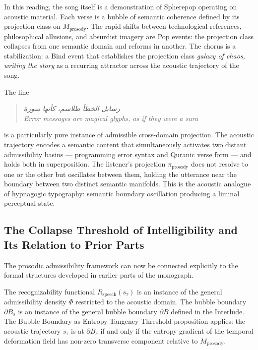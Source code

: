 \documentclass[12pt, a4paper]{article}
\theoremstyle{essaystyle}
\begin{document}
In this reading, the song itself is a demonstration of Spherepop operating on
acoustic material. Each verse is a bubble of semantic coherence defined by its
projection class on $M_{\mathrm{prosody}}$. The rapid shifts between technological
references, philosophical allusions, and absurdist imagery are Pop events: the
projection class collapses from one semantic domain and reforms in another.
The chorus is a stabilization: a Bind event that establishes the projection class
\textit{galaxy of chaos, writing the story} as a recurring attractor across the
acoustic trajectory of the song.

The line

\begin{quote}
\textit{رسايل الخطأ طلاسم، كأنها سورة} \\
\textit{Error messages are magical glyphs, as if they were a sura}
\end{quote}

is a particularly pure instance of admissible cross-domain projection. The acoustic
trajectory encodes a semantic content that simultaneously activates two distant
admissibility basins --- programming error syntax and Quranic verse form --- and
holds both in superposition. The listener's projection $\pi_{\mathrm{prosody}}$ does
not resolve to one or the other but oscillates between them, holding the utterance
near the boundary between two distinct semantic manifolds. This is the acoustic
analogue of hypnagogic typography: semantic boundary oscillation producing a
liminal perceptual state.

\subsection{The Collapse Threshold of Intelligibility and Its Relation to
Prior Parts}

The prosodic admissibility framework can now be connected explicitly to the formal
structures developed in earlier parts of the monograph.

The recognizability functional $R_{\mathrm{speech}}(s_\tau)$ is an instance of the
general admissibility density $\Phi$ restricted to the acoustic domain. The bubble
boundary $\partial B_s$ is an instance of the general bubble boundary $\partial B$
defined in the Interlude. The Bubble Boundary as Entropy Tangency Threshold proposition
applies: the acoustic trajectory $s_\tau$ is at $\partial B_s$ if and only if the
entropy gradient of the temporal deformation field has non-zero transverse component
relative to $M_{\mathrm{prosody}}$.
\end{document}
